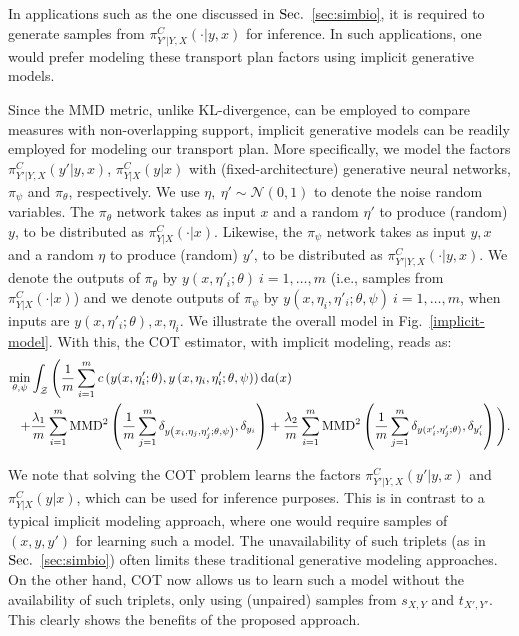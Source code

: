 In applications such as the one discussed in $\S$~\ref{sec:simbio}, it is required to generate samples from $\pi^C_{Y'|Y,X}(\cdot|y,x)$ for inference. In such applications, one would prefer modeling these transport plan factors using implicit generative models.
 

Since the MMD metric, unlike KL-divergence, can be employed to compare measures with non-overlapping support, implicit generative models can be readily employed for modeling our transport plan. More specifically, we model the factors $\pi^C_{Y'|Y, X}(y'|y, x)$, $\pi^C_{Y|X}(y|x)$ with (fixed-architecture) generative neural networks, $\pi_\psi$ and $\pi_\theta$, respectively. We use $\eta,~\eta'\sim \mathcal{N}(0, 1)$ to denote the noise random variables. The $\pi_\theta$ network takes as input $x$ and a random $\eta'$ to produce (random) $y$, to be distributed as $\pi^C_{Y|X}(\cdot|x)$. Likewise, the $\pi_\psi$ network takes as input $y,x$ and a random $\eta$ to produce (random) $y'$, to be distributed as $\pi^C_{Y'|Y,X}(\cdot|y,x)$. We denote the outputs of $\pi_\theta$ by $y(x, \eta'_i;\theta)\ i=1,\ldots,m$ (i.e., samples from $\pi^C_{Y|X}(\cdot|x)$) and we denote outputs of $\pi_\psi$ by $y\left(x, \eta_i, \eta'_i;\theta,\psi\right)\ i=1,\ldots,m$, when inputs  are $y(x, \eta'_i;\theta),x,\eta_i$. We illustrate the overall model in Fig.~\ref{implicit-model}. With this, the COT estimator, with implicit modeling, reads as:
\begin{align}\label{eqn:impcot}
\min\limits_{\theta, \psi}&\int_{\calZ}\Bigg(\frac{1}{m}\sum_{i=1}^m c\left(y(x, \eta'_i;\theta), y\left(x, \eta_i, \eta_i';\theta,\psi\right)\right)\textup{d}a(x) \\+&\frac{\lambda_1}{m}\sum_{i=1}^m\MMD^2\left(\frac{1}{m}\sum_{j=1}^m\delta_{y\left(x_i, \eta_j, \eta'_j;\theta,\psi\right) }, \delta_{y_i}\right) +\frac{\lambda_2}{m}\sum_{i=1}^m\MMD^2\left(\frac{1}{m}\sum_{j=1}^m\delta_{y(x'_i, \eta'_j;\theta) }, \delta_{y'_i}\right)\Bigg).
\end{align}

We note that solving the COT problem learns the factors $\pi^C_{Y'|Y,X}(y'|y,x)$ and $\pi^C_{Y|X}(y|x)$, which can be used for inference purposes. This is in contrast to a typical implicit modeling approach, where one would require samples of $(x,y,y')$ for learning such a model. The unavailability of such triplets (as in {~$\S$~\ref{sec:simbio}}) often limits these traditional generative modeling approaches. On the other hand, COT now allows us to learn such a model without the availability of such triplets, only using (unpaired) samples from $s_{X,Y}$ and $t_{X', Y'}$. This clearly shows the benefits of the proposed approach.

